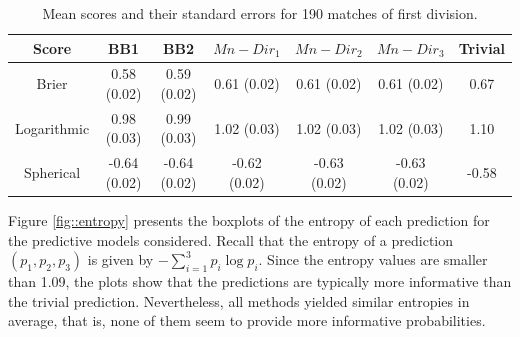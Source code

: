 \documentclass[journal,article,accept,moreauthors,pdftex,12pt,a4paper]{mdpi}
\begin{document}
    \begin{table}[H]
        \begin{center}
            \begin{tabular}{ccccccc}
                \hline
                Score & BB1 & BB2 & $Mn-Dir_1$ & $Mn-Dir_2$ & $Mn-Dir_3$ & Trivial \\
                \hline
                \hline
                Brier &0.58 (0.02) & 0.59 (0.02)& 0.61 (0.02)& 0.61 (0.02) & 0.61  (0.02) & 0.67 \\
                Logarithmic & 0.98 (0.03) & 0.99 (0.03) & 1.02 (0.03)  & 1.02 (0.03)  & 1.02 (0.03) & 1.10  \\
                Spherical &  -0.64 (0.02)& -0.64 (0.02)& -0.62 (0.02)& -0.63 (0.02)& -0.63 (0.02)& -0.58\\
                \hline
            \end{tabular}
            \caption{Mean scores and their standard errors for 190 matches of first division.}
            \label{tab::brier}
        \end{center}
    \end{table}


    Figure \ref{fig::entropy} presents the boxplots of the entropy of each prediction for the predictive models considered. Recall
        that the entropy of a prediction $(p_1,p_2,p_3)$ is given by $- \sum_{i=1}^3 p_i \log{p_i}$.
    Since the entropy values are smaller than 1.09, the plots show that the predictions
    are typically more informative than the trivial prediction. Nevertheless, all methods yielded similar entropies in average, that is,
    none of them seem to provide more informative probabilities.
\end{document}
